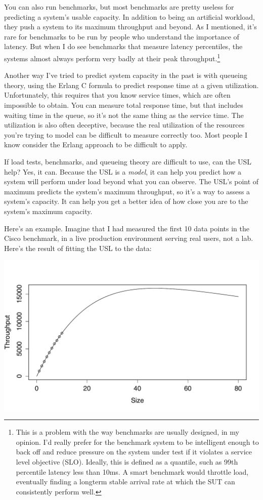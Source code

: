 \documentclass{vivid_layout}
\begin{document}
You can also run benchmarks, but most benchmarks are pretty useless for
predicting a system's usable capacity. In addition to being an artificial
workload, they push a system to its maximum throughput and beyond. As I
mentioned, it's rare for benchmarks to be run by people who understand the
importance of latency. But when I do see benchmarks that measure latency
percentiles, the systems almost always perform very badly at their peak
throughput.\footnote{This is a problem with the way benchmarks are usually
designed, in my opinion. I'd really prefer for the benchmark system to be
intelligent enough to back off and reduce pressure on the system under test if
it violates a service level objective (SLO).  Ideally, this is defined as a
quantile, such as 99th percentile latency less than 10ms.  A smart benchmark
would throttle load, eventually finding a longterm stable arrival rate at which
the SUT can consistently perform well.}

Another way I've tried to predict system capacity in the past is with queueing
theory, using the Erlang C formula to predict response time at a given
utilization.  Unfortunately, this requires that you know service times,
which are often impossible to obtain. You can measure total response time, but
that includes waiting time in the queue, so it's not the same thing as the
service time. The utilization is also often deceptive, because the real
utilization of the resources you're trying to model can be difficult to
measure correctly too. Most people I know consider the Erlang approach to be
difficult to apply.

If load tests, benchmarks, and queueing theory are difficult to use, can the USL
help? Yes, it can.  Because the USL is a {\itshape model}, it can help you
predict how a system will perform under load beyond what you can observe. The
USL's point of maximum predicts the system's maximum throughput, so it's a way
to assess a system's capacity.  It can help you get a better idea of how close
you are to the system's maximum capacity.

Here's an example. Imagine that I had measured the first 10 data points in the
Cisco benchmark, in a live production environment serving real users, not a
lab. Here's the result of fitting the USL to the data:
\begin{center}
\includegraphics[width=.85\linewidth]{scalability/cisco-2}
\end{center}
\end{document}
